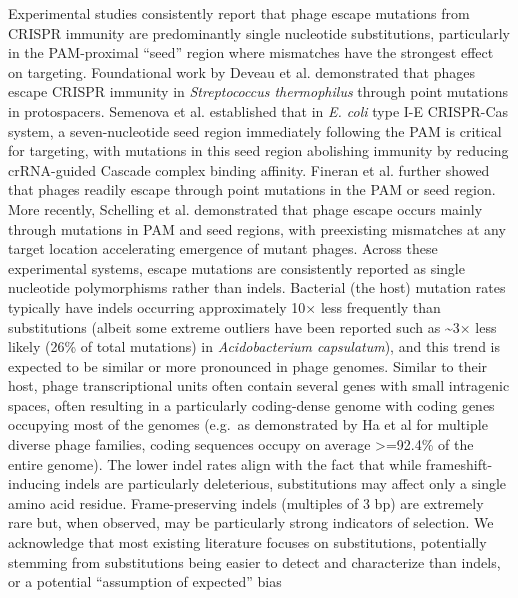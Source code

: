 \documentclass[
]{article}
\begin{document}
Experimental studies consistently report that phage escape mutations
from CRISPR immunity are predominantly single nucleotide substitutions,
particularly in the PAM-proximal ``seed'' region where mismatches have
the strongest effect on targeting. Foundational work by Deveau et
al.\autocite{Deveau2008} demonstrated that phages escape CRISPR immunity
in \emph{Streptococcus thermophilus} through point mutations in
protospacers. Semenova et al.\autocite{Semenova2011} established that in
\emph{E. coli} type I-E CRISPR-Cas system, a seven-nucleotide seed
region immediately following the PAM is critical for targeting, with
mutations in this seed region abolishing immunity by reducing
crRNA-guided Cascade complex binding affinity. Fineran et
al.\autocite{Fineran2014} further showed that phages readily escape
through point mutations in the PAM or seed region. More recently,
Schelling et al.\autocite{Schelling2023} demonstrated that phage escape
occurs mainly through mutations in PAM and seed regions, with
preexisting mismatches at any target location accelerating emergence of
mutant phages. Across these experimental systems, escape mutations are
consistently reported as single nucleotide polymorphisms rather than
indels. Bacterial (the host) mutation rates typically have indels
occurring approximately 10×\autocite{Lee_2012_mutation_rate_Ecoli} less
frequently than substitutions (albeit some extreme outliers have been
reported such as \textasciitilde3× less likely (26\% of total mutations)
in \emph{Acidobacterium
capsulatum}\autocite{Kucukyildirim_2021_high_indel_rate}), and this
trend is expected to be similar or more pronounced in phage genomes.
Similar to their host, phage transcriptional units often contain several
genes with small intragenic
spaces\autocite{Hatfull_2011_bacteriophages_genomes}, often resulting in
a particularly coding-dense genome with coding genes occupying most of
the genomes (e.g.~as demonstrated by Ha et al for multiple diverse phage
families, coding sequences occupy on average \textgreater=92.4\% of the
entire genome\autocite{Ha_2018}). The lower indel rates align with the
fact that while frameshift-inducing indels are particularly deleterious,
substitutions may affect only a single amino acid residue.
Frame-preserving indels (multiples of 3 bp) are extremely rare but, when
observed, may be particularly strong indicators of selection. We
acknowledge that most existing literature focuses on substitutions,
potentially stemming from substitutions being easier to detect and
characterize than indels, or a potential ``assumption of expected'' bias
\end{document}
